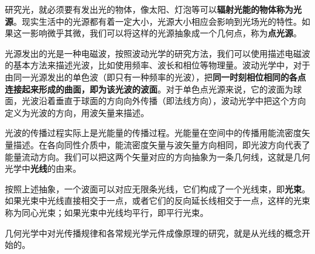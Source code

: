 
研究光，就必须要有发出光的物体，像太阳、灯泡等可以\textbf{辐射光能的物体称为光源}。现实生活中的光源都有着一定大小，光源大小相应会影响到光场光的特性。如果这一影响微乎其微，我们可以将这样的光源抽象成一个几何点，称为\textbf{点光源}。

光源发出的光是一种电磁波，按照波动光学的研究方法，我们可以使用描述电磁波的基本方法来描述光波，比如使用频率、波长和相位等物理量。波动光学中，对于由同一光源发出的单色波（即只有一种频率的光波），把\textbf{同一时刻相位相同的各点连接起来形成的曲面，即为该光波的波面}。对于单色点光源来说，它的波面为球面，光波沿着垂直于球面的方向向外传播（即法线方向），波动光学中把这个方向定义为光波的方向，用波矢量来描述。


光波的传播过程实际上是光能量的传播过程。光能量在空间中的传播用能流密度矢量描述。在各向同性介质中，能流密度矢量与波矢量方向相同，即光波方向代表了能量流动方向。我们可以把这两个矢量对应的方向抽象为一条几何线，这就是几何光学中\textbf{光线}的由来。

按照上述抽象，一个波面可以对应无限条光线，它们构成了一个光线束，即\textbf{光束}。如果光束中光线直接相交于一点，或者它们的反向延长线相交于一点，这样的光束称为同心光束；如果光束中光线均平行，即平行光束。


几何光学中对光传播规律和各常规光学元件成像原理的研究，就是从光线的概念开始的。
